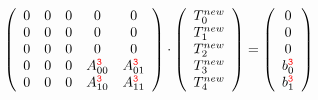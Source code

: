 \begin{itemize}
\[
\left( \begin{array}{ccccc}
0 & 0 & 0 & 0 & 0 \\ 
0 & 0 & 0 & 0 & 0 \\ 
0 & 0 & 0 & 0 & 0 \\ 
0 & 0 & 0 & A_{00}^{{\color{red}\tt 3}} &  A_{01}^{{\color{red}\tt 3}}  \\ 
0 & 0 & 0 & A_{10}^{{\color{red}\tt 3}} &  A_{11}^{{\color{red}\tt 3}}  \\
\end{array} \right) \cdot
\left(\begin{array}{c}
T_0^{new} \\ T_1^{new} \\ T_2^{new} \\ T_3^{new} \\ T_4^{new}
\end{array} \right)
=
\left(\begin{array}{c}
0 \\ 0 \\ 0 \\ b_{0}^{{\color{red}\tt 3}} \\  b_{1}^{{\color{red}\tt 3}} 
\end{array}\right)
\]




\end{itemize}






